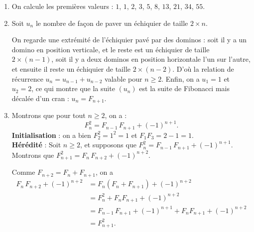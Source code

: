 \begin{Soln}{48}
\begin{enumerate}
\item On calcule les premières valeurs : $1$, $1$, $2$, $3$, $5$, $8$, $13$, $21$, $34$, $55$.
\item Soit $u_n$ le nombre de façon de paver un échiquier de taille $2 \times n$.

On regarde une extrémité de l'échiquier pavé par des dominos : soit il y a un domino en position verticale, et le reste est un échiquier de taille $2 \times (n-1)$, soit il y a deux dominos en position horizontale l'un sur l'autre, et ensuite il reste un échiquier de taille $2 \times (n-2)$. D'où la relation de récurrence $u_{n} = u_{n-1} + u_{n-2}$ valable pour $n\geq 2$. Enfin, on a $u_1=1$ et $u_2=2$, ce qui montre que la suite $(u_n)$ est la suite de Fibonacci mais décalée d'un cran : $u_n=F_{n+1}$.
\item Montrons que pour tout $n\geq 2$, on a :\[F_n^2 = F_{n-1}\,F_{n+1} + (-1)^{n+1}.\]
\textbf{Initialisation} : on a bien $F_2^2=1^2=1$ et $F_1F_3 =2-1=1$. \\
\textbf{Hérédité} : Soit $n\geq 2$, et supposons que $F_n^2 = F_{n-1}\,F_{n+1} + (-1)^{n+1}$. Montrons que $F_{n+1}^2 = F_{n}\,F_{n+2} + (-1)^{n+2}$.

Comme $F_{n+2} = F_n+F_{n+1}$, on a
\begin{align*}
F_{n}\,F_{n+2} + (-1)^{n+2}
&= F_{n}(F_n+F_{n+1}) + (-1)^{n+2}\\
&= F_n^2+F_nF_{n+1}+ (-1)^{n+2}\\
&= F_{n-1}\,F_{n+1} + (-1)^{n+1} + F_nF_{n+1}+ (-1)^{n+2}\\
&= F_{n+1}^2.
\end{align*}
\end{enumerate}
\end{Soln}
